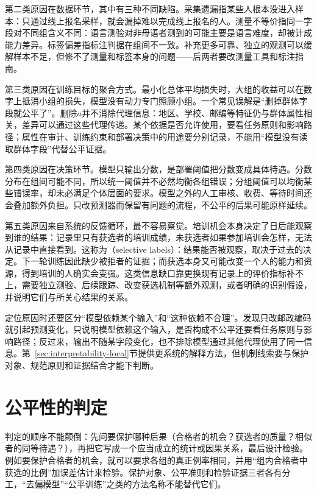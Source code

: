 第二类原因在数据环节，其中有三种不同缺陷。采集遗漏指某些人根本没进入样本：只通过线上报名采样，就会漏掉难以完成线上报名的人。测量不等价指同一字段对不同组含义不同：语言测验对非母语者测到的可能主要是语言难度，却被计成能力差异。标签偏差指标注判据在组间不一致。补充更多可靠、独立的观测可以缓解样本不足，但修不了测量和标签本身的问题——后两者要改测量工具和标注指南。

第三类原因在训练目标的聚合方式。最小化总体平均损失时，大组的收益可以在数字上抵消小组的损失，模型没有动力专门照顾小组。一个常见误解是“删掉群体字段就公平了”。删除$a$并不消除代理信息：地区、学校、邮编等特征仍与群体属性相关，差异可以通过这些代理传递。某个依据是否允许使用，要看任务原则和影响路径；属性在审计、训练约束和部署决策中的用途要分别记录，不能用“模型没有读取群体字段”代替公平证据。

第四类原因在决策环节。模型只输出分数，是部署阈值把分数变成具体待遇。分数分布在组间可能不同，所以统一阈值并不必然均衡各组错误；分组阈值可以均衡某些错误率，却未必满足个体层面的要求。模型之外的人工审核、收费、等待时间还会叠加额外负担。只改预测器而保留有问题的流程，不公平的后果可能原样延续。

第五类原因来自系统的反馈循环，最不容易察觉。培训机会本身决定了日后能观察到谁的结果：记录里只有获选者的培训成绩，未获选者如果参加培训会怎样，无法从记录中直接看到。这称为（selective labels）：结果能否被观察，取决于过去的决定。下一轮训练因此缺少被拒者的证据；而获选本身又可能改变一个人的能力和资源，得到培训的人确实会变强。这类信息缺口靠更换现有记录上的评价指标补不上，需要独立测验、后续跟踪、改变获选机制等额外观测，或者明确的识别假设，并说明它们与所关心结果的关系。

定位原因时还要区分“模型依赖某个输入”和“这种依赖不合理”。发现只改邮政编码就引起预测变化，只说明模型依赖这个输入，是否构成不公平还要看任务原则与影响路径；反过来，输出不随某字段变化，也不排除模型通过其他代理使用了同一信息。第~\ref{sec:interpretability-local}节提供更系统的解释方法，但机制线索要与保护对象、规范原则和证据结合才能下判断。

\section{公平性的判定}
\label{sec:fairness-criteria}

判定的顺序不能颠倒：先问要保护哪种后果（合格者的机会？获选者的质量？相似者的同等待遇？），再把它写成一个应当成立的统计或因果关系，最后设计检验。例如要保护合格者的机会，就可以要求各组的真正例率相同，并用“组内合格者中获选的比例”加误差估计来检验。保护对象、公平准则和检验证据三者各有分工，“去偏模型”“公平训练”之类的方法名称不能替代它们。

